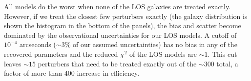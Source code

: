 All models do the worst when none of the LOS galaxies are treated exactly. However, if we treat the closest few perturbers exactly (the galaxy distribution is shown the histogram in the bottom of the panels), the bias and scatter become dominated by the observational uncertainties for our LOS models. A cutoff of $10^{-4}$ arcseconds ($\sim3\%$ of our assumed uncertainties) has no bias in any of the recovered parameters and the reduced $\chi^2$ of the LOS models are $\sim 1$. This cut leaves $\sim 15$ perturbers that need to be treated exactly out of the $\sim 300$ total, a factor of more than $400$ increase in efficiency.
  
  
  